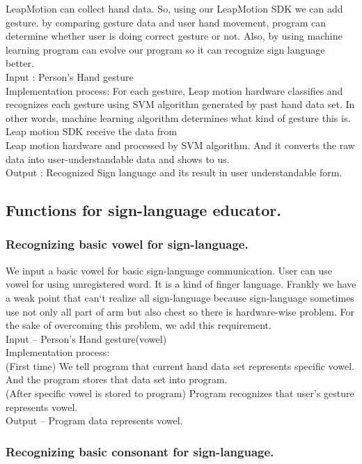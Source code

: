 \documentclass[10pt,journal,compsoc]{IEEEtran}
\begin{document}
LeapMotion can collect hand data. So, using our LeapMotion SDK we can add gesture. by comparing gesture data and user hand movement, program can determine whether user is doing correct gesture or not. Also, by using machine learning program can evolve our program so it can recognize sign language better.
\\Input : Person's Hand gesture
\\Implementation process: For each gesture, Leap motion hardware classifies and recognizes each gesture using SVM algorithm generated by past hand data set. In other words, machine learning algorithm determines what kind of gesture this is. Leap motion SDK receive the data from \\Leap motion hardware and processed by SVM algorithm. And it converts the raw data into user-understandable data and shows to us.
\\Output : Recognized Sign language and its result in user understandable form.

\subsection{Functions for sign-language educator.\\}


\subsubsection{Recognizing basic vowel for sign-language.}

We input a basic vowel for basic sign-language communication. User can use vowel for using unregistered word. It is a kind of finger language. Frankly we have a weak point that can`t realize all sign-language because sign-language sometimes use not only all part of arm but also chest so there is hardware-wise problem. For the sake of overcoming this problem, we add this requirement.
\\Input – Person's Hand gesture(vowel)
\\Implementation process:
\\(First time) We tell program that current hand data set represents specific vowel. And the program stores that data set into program.
\\(After specific vowel is stored to program) Program recognizes that user’s gesture represents vowel.
\\Output – Program data represents vowel.

\subsubsection{Recognizing basic consonant for sign-language.}
\end{document}
